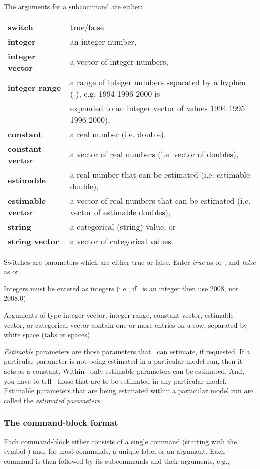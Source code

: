 The arguments for a subcommand are either:

\begin{tabular}{ll}
\textbf{switch} & true/false\\ 
\textbf{integer}& an integer number,\\
\textbf{integer vector} & a vector of integer numbers,\\
\textbf{integer range} & a range of integer numbers separated by a hyphen (-), e.g. 1994-1996 2000 is \\ & expanded to an integer vector of values 1994 1995 1996 2000),\\
\textbf{constant} & a real number (i.e. double),\\
\textbf{constant vector} & a vector of real numbers (i.e. vector of doubles),\\
\textbf{estimable} & a real number that can be estimated (i.e. estimable double),\\
\textbf{estimable vector} & a vector of real numbers that can be estimated (i.e. vector of estimable doubles),\\
\textbf{string} & a categorical (string) value, or\\
\textbf{string vector} & a vector of categorical values.
\end{tabular}

Switches are parameters which are either true or false. Enter \emph{true} as  or , and \emph{false} as  or . 

Integers must be entered as integers (i.e., if \ is an integer then use 2008, not 2008.0)

Arguments of type integer vector, integer range, constant vector, estimable vector, or categorical vector contain one or more entries on a row, separated by white space (tabs or spaces). 

\emph{Estimable} parameters are those parameters that \CNAME\ can estimate, if requested. If a particular parameter is not being estimated in a particular model run, then it acts as a constant.  Within \CNAME\, only estimable parameters can be estimated. And, you have to tell \CNAME\ those that are to be estimated in any particular model. Estimable parameters that are being estimated within a particular model run are called the \emph{estimated parameters}.

\subsubsection{The command-block format}
Each command-block either consists of a single command (starting with the symbol \command{}) and, for most commands, a unique label or an argument. Each command is then followed by its subcommands and their arguments, e.g., 

